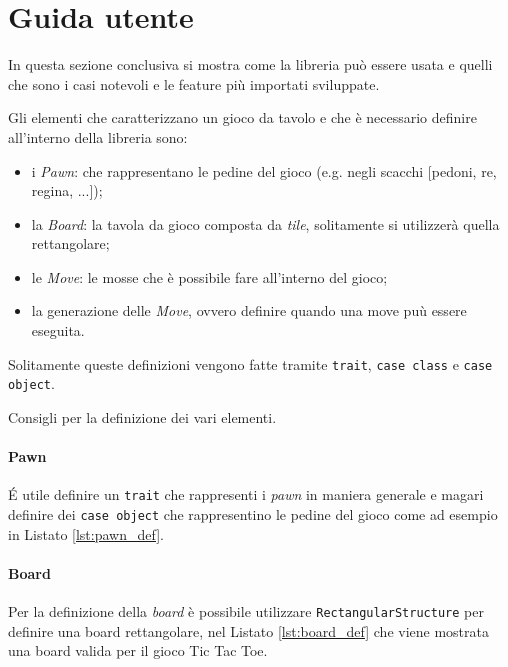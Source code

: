 \section{Guida utente}
%
In questa sezione conclusiva si mostra come la libreria può essere usata e quelli che sono i casi notevoli e le feature più importati sviluppate.

Gli elementi che caratterizzano un gioco da tavolo e che è necessario definire all'interno della libreria sono:
\begin{itemize}
  \item i \textit{Pawn}: che rappresentano le pedine del gioco (e.g. negli scacchi [pedoni, re, regina, ...]);
  \item la \textit{Board}: la tavola da gioco composta da \textit{tile}, solitamente si utilizzerà quella rettangolare;
  \item le \textit{Move}: le mosse che è possibile fare all'interno del gioco;
  \item la generazione delle \textit{Move}, ovvero definire quando una move puù essere eseguita.
\end{itemize}
%
Solitamente queste definizioni vengono fatte tramite \texttt{trait}, \texttt{case class} e \texttt{case object}.

Consigli per la definizione dei vari elementi.
\paragraph{Pawn}
%
\'E utile definire un \texttt{trait} che rappresenti i \textit{pawn} in maniera generale e magari definire dei \texttt{case object} che rappresentino le pedine del gioco come ad esempio in Listato \ref{lst:pawn_def}.
%


\paragraph{Board}
%
Per la definizione della \textit{board} è possibile utilizzare \texttt{RectangularStructure} per definire una board rettangolare, nel Listato \ref{lst:board_def} che viene mostrata una board valida per il gioco Tic Tac Toe.
%



